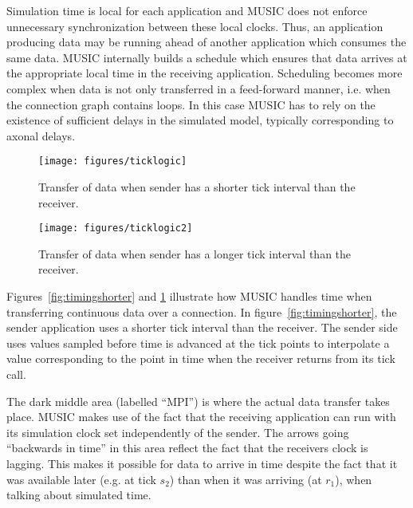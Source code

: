 \documentclass[a4paper,twoside]{report}
\begin{document}
Simulation time is local for each application
and MUSIC does not enforce unnecessary synchronization between these
local clocks.  Thus, an application producing data may be running
ahead of another application which consumes the same data.  MUSIC
internally builds a schedule which ensures that data arrives at the
appropriate local time in the receiving application.  Scheduling
becomes more complex when data is not only transferred in a
feed-forward manner, i.e. when the connection graph contains loops.
In this case MUSIC has to rely on the existence of sufficient delays
in the simulated model, typically corresponding to axonal
delays.

\begin{figure}
  \begin{center}
    \begin{minipage}{0.45\textwidth}
      \texttt{[image: figures/ticklogic]}
      \caption[Timing of data transfer, slowdown]{\label{fig:timingshorter}
        Transfer of data when sender has a shorter
        tick interval than the receiver.}
    \end{minipage}
    \hfill
    \begin{minipage}{0.45\textwidth}
      \texttt{[image: figures/ticklogic2]}
      \caption[Timing of data transfer, speedup]{\label{fig:timinglonger}
        Transfer of data when sender has a longer
        tick interval than the receiver.}
    \end{minipage}
  \end{center}
\end{figure}

Figures~\ref{fig:timingshorter} and \ref{fig:timinglonger} illustrate
how MUSIC handles time when transferring continuous data over a
connection.  In figure~\ref{fig:timingshorter}, the sender application
uses a shorter tick interval than the receiver.  The sender side uses
values sampled before time is advanced at the tick points to
interpolate a value corresponding to the point in time when the
receiver returns from its tick call.

The dark middle area (labelled ``MPI'') is where the actual data
transfer takes place.  MUSIC makes use of the fact that the receiving
application can run with its simulation clock set independently of the
sender.  The arrows going ``backwards in time'' in this area reflect
the fact that the receivers clock is lagging.  This makes it possible
for data to arrive in time despite the fact that it was available
later (e.g. at tick \(s_2\)) than when it was arriving (at \(r_1\)),
when talking about simulated time.
\end{document}
